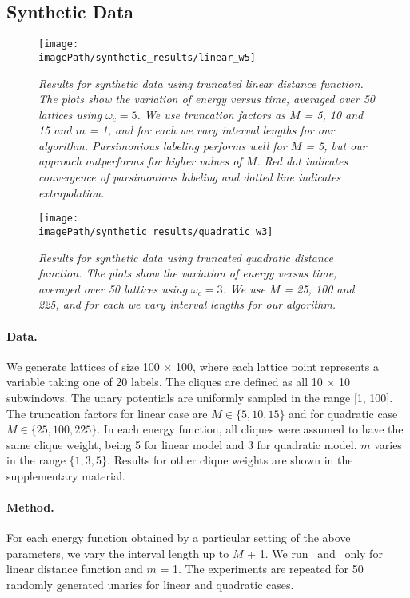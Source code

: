 \documentclass[runningheads]{llncs}
\newcommand{\imagePath}{../images}
\newcommand{\mysubsection}[1]{\vspace{-1mm}\subsection{#1}\vspace{-1mm}}
\newcommand{\myparagraph}[1]{\vspace{-2mm}\paragraph{#1}}
\newcommand{\mycaption}[1]{\vspace{-1mm}\caption{#1}\vspace{-3mm}}
\begin{document}
\mysubsection{Synthetic Data}
\vspace{2mm}

\begin{figure*}[t]
\centerline{
\texttt{[image: \\imagePath/synthetic\_results/linear\_w5]}
}
\vspace{3mm}
\mycaption{\footnotesize \em Results for synthetic data using truncated linear distance function. The plots show the variation of energy versus time, averaged over 50 lattices using $\omega_c = 5$. We use truncation factors as $M$ = 5, 10 and 15  and $m$ = 1, and for each we vary interval lengths for our algorithm. Parsimonious labeling performs well for $M$ = 5, but our approach outperforms for higher values of $M$. Red dot indicates convergence of parsimonious labeling and dotted line indicates extrapolation.}
\label{fig:max-of-linear_synthetic}
\end{figure*}

\begin{figure*}[t]
\centerline{
\texttt{[image: \\imagePath/synthetic\_results/quadratic\_w3]}
}
\vspace{3mm}
\mycaption{\footnotesize \em Results for synthetic data using truncated quadratic distance function. The plots show the variation of energy versus time, averaged over 50 lattices using $\omega_c = 3$. We use $M$ = 25, 100 and 225, and for each we vary interval lengths for our algorithm.}
\label{fig:max-of-quadratic_synthetic}
\end{figure*}

\myparagraph{\bf Data.} We generate lattices of size 100 $\times$ 100, where each lattice point represents a variable taking one of 20 labels. The cliques are defined as all 10 $\times$ 10 subwindows. The unary potentials are uniformly sampled in the range [1, 100]. The truncation factors for linear case are $M \in \{5, 10, 15\}$ and for quadratic case $M \in \{25, 100, 225\}$. In each energy function, all cliques were assumed to have the same clique weight, being 5 for linear model and 3 for quadratic model. $m$ varies in the range $\{1, 3, 5\}$. Results for other clique weights are shown in the supplementary material.

\myparagraph{\bf Method.} For each energy function obtained by a particular setting of the above parameters, we vary the interval length up to $M$ + 1. We run~\cite{dokaniaiccv15} and~\cite{ladickyeccv10} only for linear distance function and $m$ = 1. The experiments are repeated for 50 randomly generated unaries for linear and quadratic cases. 
\end{document}
